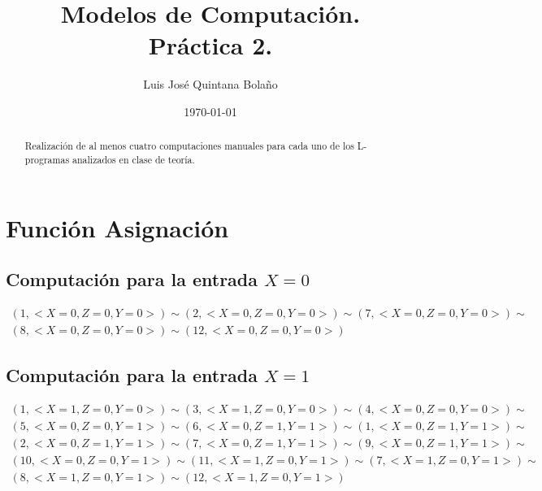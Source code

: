 \documentclass[a4paper]{article}
\title{Modelos de Computación.\\ Práctica 2. }
\author{Luis José Quintana Bolaño}
\date{\today}
\begin{document}
		\maketitle
		\begin{abstract}
		    Realización de al menos cuatro computaciones manuales para cada uno de los L-programas analizados en clase de teoría.
  		\end{abstract}

  		\section{Función Asignación}
		\subsection{Computación para la entrada $X=0$}
		\begin{equation*}\begin{gathered}
		(1, <X=0, Z=0, Y=0>) \sim (2, <X=0, Z=0, Y=0>) \sim (7, <X=0, Z=0, Y=0>) \sim\\
		(8, <X=0, Z=0, Y=0>) \sim (12, <X=0, Z=0, Y=0>)
		\end{gathered}\end{equation*}
		\subsection{Computación para la entrada $X=1$}
		\begin{equation*}\begin{gathered}
		(1, <X=1, Z=0, Y=0>) \sim (3, <X=1, Z=0, Y=0>) \sim (4, <X=0, Z=0, Y=0>) \sim\\
		(5, <X=0, Z=0, Y=1>) \sim (6, <X=0, Z=1, Y=1>) \sim (1, <X=0, Z=1, Y=1>) \sim\\
		(2, <X=0, Z=1, Y=1>) \sim (7, <X=0, Z=1, Y=1>) \sim (9, <X=0, Z=1, Y=1>) \sim\\
		(10, <X=0, Z=0, Y=1>) \sim (11, <X=1, Z=0, Y=1>) \sim (7, <X=1, Z=0, Y=1>) \sim\\
		(8, <X=1, Z=0, Y=1>) \sim (12, <X=1, Z=0, Y=1>)
		\end{gathered}\end{equation*}
\end{document}
